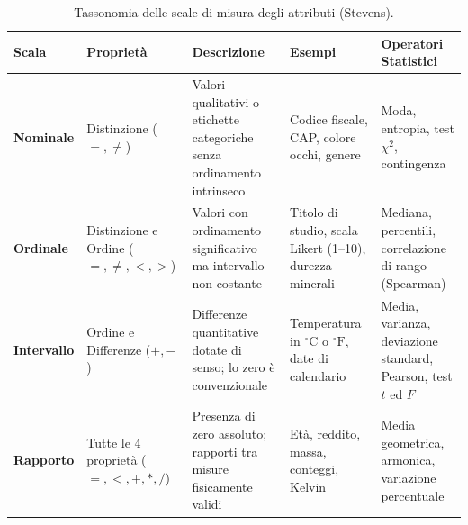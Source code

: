 \begin{table}[H]
\centering
\footnotesize
\begin{tabularx}{\textwidth}{l p{2.2cm} X p{2.6cm} p{3.0cm}}
\toprule
\textbf{Scala} & \textbf{Proprietà} & \textbf{Descrizione} & \textbf{Esempi} & \textbf{Operatori Statistici} \\
\midrule
\textbf{Nominale} & Distinzione ($=, \neq$) & Valori qualitativi o etichette categoriche senza ordinamento intrinseco & Codice fiscale, CAP, colore occhi, genere & Moda, entropia, test $\chi^2$, contingenza \\
\addlinespace
\textbf{Ordinale} & Distinzione e Ordine ($=, \neq, <, >$) & Valori con ordinamento significativo ma intervallo non costante & Titolo di studio, scala Likert (1--10), durezza minerali & Mediana, percentili, correlazione di rango (Spearman) \\
\addlinespace
\textbf{Intervallo} & Ordine e Differenze ($+, -$) & Differenze quantitative dotate di senso; lo zero è convenzionale & Temperatura in $^\circ\text{C}$ o $^\circ\text{F}$, date di calendario & Media, varianza, deviazione standard, Pearson, test $t$ ed $F$ \\
\addlinespace
\textbf{Rapporto} & Tutte le 4 proprietà ($=, <, +, *, /$) & Presenza di zero assoluto; rapporti tra misure fisicamente validi & Età, reddito, massa, conteggi, Kelvin & Media geometrica, armonica, variazione percentuale \\
\bottomrule
\end{tabularx}
\caption{Tassonomia delle scale di misura degli attributi (Stevens).}
\label{tab:attribute-types}
\end{table}

